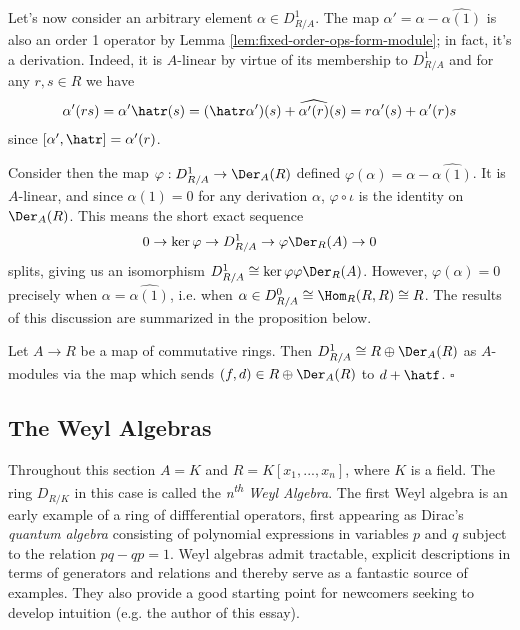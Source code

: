 Let's now consider an arbitrary element $\alpha \in D^1_{R/A}$. The map $\alpha' = \alpha - \widehat{\alpha(1)}$ is also an order 1 operator by Lemma \ref{lem:fixed-order-ops-form-module}; in fact, it's a derivation. Indeed, it is $A$-linear by virtue of its membership to $D^1_{R/A}$ and for any $r,s\in R$ we have
\begin{align*}
	\alpha'(rs) = \alpha'\hatr(s) = (\hatr \alpha')(s) + \widehat{\alpha'(r)}(s) = r\alpha'(s) + \alpha'(r)s
\end{align*}
since $[\alpha',\hatr] = \alpha'(r)$. 

Consider then the map $\varphi:D^1_{R/A}\to \Der_A(R)$ defined $\varphi(\alpha) = \alpha - \widehat{\alpha(1)}$. It is $A$-linear, and since $\alpha(1) = 0$ for any derivation $\alpha$, $\varphi\circ \iota$ is the identity on $\Der_A(R)$. This means the short exact sequence
\begin{align*}
	0 \to \ker \varphi \to D^1_{R/A} \to{\varphi} \Der_R(A) \to 0
\end{align*}
splits, giving us an isomorphism $D^1_{R/A} \cong \ker \varphi\varphi \Der_R(A)$. However, $\varphi(\alpha) = 0$ precisely when $\alpha = \widehat{\alpha(1)}$, i.e. when $\alpha \in D^0_{R/A} \cong \Hom_R(R,R) \cong R$. The results of this discussion are summarized in the proposition below.

\begin{prop}\label{prop:order-one-operators}
	Let $A\to R$ be a map of commutative rings. Then $D^1_{R/A}\cong R\oplus \Der_A(R)$ as $A$-modules via the map which sends $(f,d) \in R\oplus \Der_A(R)$ to $d + \hatf$. \hfill $\square$
\end{prop}
\subsection{The Weyl Algebras}\label{sec:Weyl-algebra}

Throughout this section $A = K$ and $R = K[x_1,...,x_n]$, where $K$ is a field. The ring $D_{R/K}$ in this case is called the \emph{n\textsuperscript{th} Weyl Algebra}. The first Weyl algebra is an early example of a ring of diffferential operators, first appearing as Dirac's \emph{quantum algebra} consisting of polynomial expressions in variables $p$ and $q$ subject to the relation $pq - qp = 1$. Weyl algebras admit tractable, explicit descriptions in terms of generators and relations and thereby serve as a fantastic source of examples. They also provide a good starting point for newcomers seeking to develop intuition (e.g. the author of this essay).

